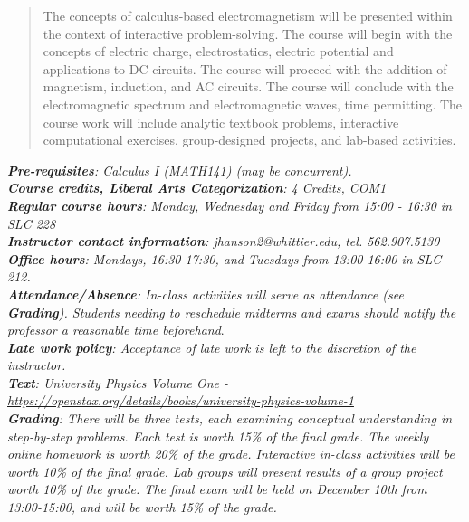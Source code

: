 \documentclass[10pt]{article}
\begin{document}
\maketitle



\begin{abstract}
The concepts of calculus-based electromagnetism will be presented within the context of interactive problem-solving.  The course will begin with the concepts of electric charge, electrostatics, electric potential and applications to DC circuits.  The course will proceed with the addition of magnetism, induction, and AC circuits.  The course will conclude with the electromagnetic spectrum and electromagnetic waves, time permitting.  The course work will include analytic textbook problems, interactive computational exercises, group-designed projects, and lab-based activities.
\end{abstract}
\noindent
\textit{\textbf{Pre-requisites}: Calculus I (MATH141) (may be concurrent).} \\
\textit{\textbf{Course credits, Liberal Arts Categorization}: 4 Credits, COM1} \\
\textit{\textbf{Regular course hours}: Monday, Wednesday and Friday from 15:00 - 16:30 in SLC 228} \\
\textit{\textbf{Instructor contact information}: jhanson2@whittier.edu, tel. 562.907.5130} \\
\textit{\textbf{Office hours}: Mondays, 16:30-17:30, and Tuesdays from 13:00-16:00 in SLC 212.} \\
\textit{\textbf{Attendance/Absence}: In-class activities will serve as attendance (see \textbf{Grading}). Students needing to reschedule
midterms and exams should notify the professor a reasonable time beforehand}.\\ 
\textit{\textbf{Late work policy}: Acceptance of late work is left to the discretion of the instructor.} \\
\textit{\textbf{Text}: University Physics Volume One - \url{https://openstax.org/details/books/university-physics-volume-1}} \\
\textit{\textbf{Grading}: There will be three tests, each examining conceptual understanding in step-by-step problems. Each test is
worth 15\% of the final grade. The weekly online homework is worth 20\% of the grade. Interactive in-class activities will be worth 10\% of the final grade. Lab groups will present results of a group project worth 10\% of the grade. The final exam will be held on December 10th from 13:00-15:00, and will be worth 15\% of the grade.} \\
\end{document}
